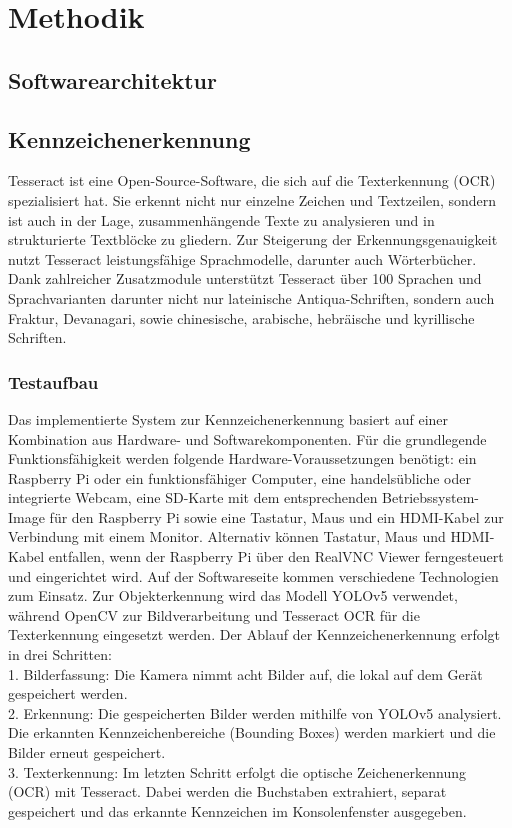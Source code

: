 \section{Methodik}
\subsection{Softwarearchitektur}
\subsection{Kennzeichenerkennung}
Tesseract ist eine Open-Source-Software, die sich auf die Texterkennung (OCR) spezialisiert hat. Sie erkennt nicht nur einzelne Zeichen und Textzeilen, sondern ist auch in der Lage, zusammenhängende Texte zu analysieren und in strukturierte Textblöcke zu gliedern. Zur Steigerung der Erkennungsgenauigkeit nutzt Tesseract leistungsfähige Sprachmodelle, darunter auch Wörterbücher. Dank zahlreicher Zusatzmodule unterstützt Tesseract über 100 Sprachen und Sprachvarianten darunter nicht nur lateinische Antiqua-Schriften, sondern auch Fraktur, Devanagari, sowie chinesische, arabische, hebräische und kyrillische Schriften.
\subsubsection{Testaufbau}
Das implementierte System zur Kennzeichenerkennung basiert auf einer Kombination aus Hardware- und Softwarekomponenten. Für die grundlegende Funktionsfähigkeit werden folgende Hardware-Voraussetzungen benötigt: ein Raspberry Pi oder ein funktionsfähiger Computer, eine handelsübliche oder integrierte Webcam, eine SD-Karte mit dem entsprechenden Betriebssystem-Image für den Raspberry Pi sowie eine Tastatur, Maus und ein HDMI-Kabel zur Verbindung mit einem Monitor. Alternativ können Tastatur, Maus und HDMI-Kabel entfallen, wenn der Raspberry Pi über den RealVNC Viewer ferngesteuert und eingerichtet wird.\singlespacing 
Auf der Softwareseite kommen verschiedene Technologien zum Einsatz. Zur Objekterkennung wird das Modell YOLOv5 verwendet, während OpenCV zur Bildverarbeitung und Tesseract OCR für die Texterkennung eingesetzt werden. \singlespacing
Der Ablauf der Kennzeichenerkennung erfolgt in drei Schritten: \\
1. Bilderfassung: Die Kamera nimmt acht Bilder auf, die lokal auf dem Gerät gespeichert werden.\\
2. Erkennung: Die gespeicherten Bilder werden mithilfe von YOLOv5 analysiert. Die erkannten Kennzeichenbereiche (Bounding Boxes) werden markiert und die Bilder erneut gespeichert. \\
3. Texterkennung: Im letzten Schritt erfolgt die optische Zeichenerkennung (OCR) mit Tesseract. Dabei werden die Buchstaben extrahiert, separat gespeichert und das erkannte Kennzeichen im Konsolenfenster ausgegeben. \\

